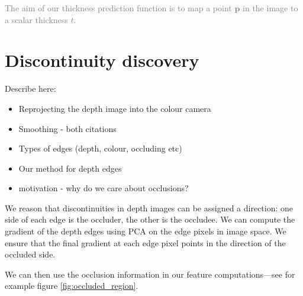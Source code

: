 \documentclass[10pt,twocolumn,letterpaper]{article}
\newcommand{\point}{\mathbf{p}}
\newcommand{\remove}[1]{\textcolor{grey}{#1}}
\begin{document}
\remove{The aim of our thickness prediction function is to map a point $\point$ in the image to a scalar thickness $t$.}


\section{Discontinuity discovery}

Describe here:
\begin{itemize}
\item Reprojecting the depth image into the colour camera
\item Smoothing - both citations
\item Types of edges (depth, colour, occluding etc)
\item Our method for depth edges
\item motivation - why do we care about occlusions?
\end{itemize}

We reason that discontinuities in depth images can be assigned a direction: one side of each edge is the occluder, the other is the occludee. 
We can compute the gradient of the depth edges using PCA on the edge pixels in image space.
We ensure that the final gradient at each edge pixel points in the direction of the occluded side.

We can then use the occlusion information in our feature computations---see for example figure \ref{fig:occluded_region}.
\end{document}
